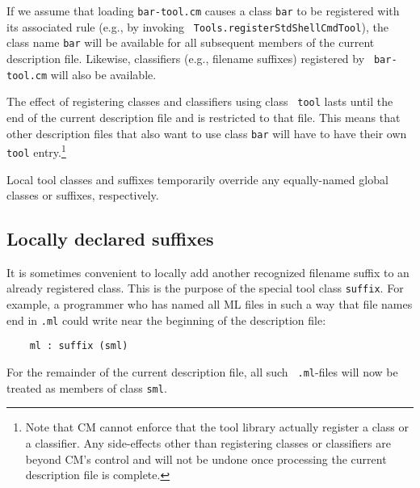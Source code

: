 If we assume that loading {\tt bar-tool.cm} causes a class {\tt bar}
to be registered with its associated rule (e.g., by invoking {\tt
Tools.registerStdShellCmdTool}), the class name {\tt bar} will be
available for all subsequent members of the current description file.
Likewise, classifiers (e.g., filename suffixes) registered by {\tt
bar-tool.cm} will also be available.

The effect of registering classes and classifiers using class {\tt
tool} lasts until the end of the current description file and is
restricted to that file.  This means that other description files that
also want to use class {\tt bar} will have to have their own {\tt
tool} entry.\footnote{Note that CM cannot enforce that the tool
library actually register a class or a classifier.  Any side-effects
other than registering classes or classifiers are beyond CM's control
and will not be undone once processing the current description file is
complete.}

Local tool classes and suffixes temporarily override any equally-named
global classes or suffixes, respectively.

\subsection{Locally declared suffixes}
\label{sec:localsuffixes}

It is sometimes convenient to locally add another recognized filename
suffix to an already registered class.  This is the purpose of the
special tool class {\tt suffix}.  For example, a programmer who has
named all ML files in such a way that file names end in {\tt .ml}
could write near the beginning of the description file:

\begin{lstlisting}
    ml : suffix (sml)
\end{lstlisting}%

For the remainder of the current description file, all such {\tt
.ml}-files will now be treated as members of class {\tt sml}.
